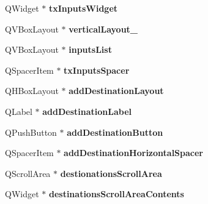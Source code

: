 \begin{DoxyCompactItemize}
\mbox{\label{class_ui___multisig_dialog_a0ef912adf4ac9af3df843af19e23e709}} 
Q\+Widget $\ast$ {\bfseries tx\+Inputs\+Widget}
\item 
\mbox{\label{class_ui___multisig_dialog_ab8136fb5887191e87ae4feb2f0318c9d}} 
Q\+V\+Box\+Layout $\ast$ {\bfseries vertical\+Layout\+\_}
\item 
\mbox{\label{class_ui___multisig_dialog_a18fad130d1f39238a004f02761c2527d}} 
Q\+V\+Box\+Layout $\ast$ {\bfseries inputs\+List}
\item 
\mbox{\label{class_ui___multisig_dialog_a76565693a2d9e8e25b5690741d592d64}} 
Q\+Spacer\+Item $\ast$ {\bfseries tx\+Inputs\+Spacer}
\item 
\mbox{\label{class_ui___multisig_dialog_a5e9381608dbada3e3a96ebfd917f0612}} 
Q\+H\+Box\+Layout $\ast$ {\bfseries add\+Destination\+Layout}
\item 
\mbox{\label{class_ui___multisig_dialog_a46da4eeeab80122a3947330f2b080096}} 
Q\+Label $\ast$ {\bfseries add\+Destination\+Label}
\item 
\mbox{\label{class_ui___multisig_dialog_afd04faca1821195be28d0b18e9cdbea5}} 
Q\+Push\+Button $\ast$ {\bfseries add\+Destination\+Button}
\item 
\mbox{\label{class_ui___multisig_dialog_a1b4518885f359c0c6329c295d9e7cb02}} 
Q\+Spacer\+Item $\ast$ {\bfseries add\+Destination\+Horizontal\+Spacer}
\item 
\mbox{\label{class_ui___multisig_dialog_ad8ea65d63ca2cd7d137a1c42a08d7bb8}} 
Q\+Scroll\+Area $\ast$ {\bfseries destionations\+Scroll\+Area}
\item 
\mbox{\label{class_ui___multisig_dialog_ac31e670f125b9cfd18e85ab56ff8e13a}} 
Q\+Widget $\ast$ {\bfseries destinations\+Scroll\+Area\+Contents}
\item 
\mbox{\label{class_ui___multisig_dialog_a277c1855237bfe9c480f7a971d167100}} 

\end{DoxyCompactItemize}
